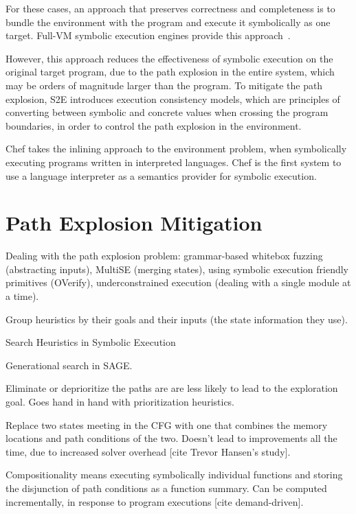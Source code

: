 For these cases, an approach that preserves correctness and completeness is to bundle the environment with the program and execute it symbolically as one target.
%
Full-VM symbolic execution engines provide this approach~\cite{s2e,bitBlaze}.

However, this approach reduces the effectiveness of symbolic execution on the original target program, due to the path explosion in the entire system, which may be orders of magnitude larger than the program.
%
To mitigate the path explosion, S2E introduces execution consistency models, which are principles of converting between symbolic and concrete values when crossing the program boundaries, in order to control the path explosion in the environment.

Chef takes the inlining approach to the environment problem, when symbolically executing programs written in interpreted languages.  Chef is the first system to use a language interpreter as a semantics provider for symbolic execution.



\iffalse
\section{Path Explosion Mitigation}
\label{sec:relwork:pathexpl}

Dealing with the path explosion problem: grammar-based whitebox fuzzing (abstracting inputs), MultiSE (merging states), using symbolic execution friendly primitives (OVerify), underconstrained execution (dealing with a single module at a time).

Group heuristics by their goals and their inputs (the state information they use).

Search Heuristics in Symbolic Execution

Generational search in SAGE.

Eliminate or deprioritize the paths are are less likely to lead to the exploration goal.  Goes hand in hand with prioritization heuristics.

Replace two states meeting in the CFG with one that combines the memory locations and path conditions of the two.  Doesn't lead to improvements all the time, due to increased solver overhead [cite Trevor Hansen's study].

Compositionality means executing symbolically individual functions and storing the disjunction of path conditions as a function summary.  Can be computed incrementally, in response to program executions [cite demand-driven].


